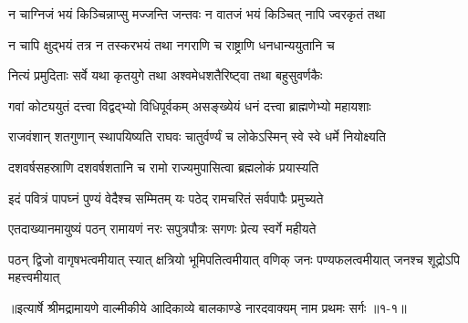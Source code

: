 \twolineshloka
{न चाग्निजं भयं किञ्चिन्नाप्सु मज्जन्ति जन्तवः}
{न वातजं भयं किञ्चित् नापि ज्वरकृतं तथा} %

\twolineshloka
{न चापि क्षुद्भयं तत्र न तस्करभयं तथा}
{नगराणि च राष्ट्राणि धनधान्ययुतानि च} %

\twolineshloka
{नित्यं प्रमुदिताः सर्वे यथा कृतयुगे तथा}
{अश्वमेधशतैरिष्ट्वा तथा बहुसुवर्णकैः} %

\twolineshloka
{गवां कोट्ययुतं दत्त्वा विद्वद्भ्यो विधिपूर्वकम्}
{असङ्ख्येयं धनं दत्त्वा ब्राह्मणेभ्यो महायशाः} %

\twolineshloka
{राजवंशान् शतगुणान् स्थापयिष्यति राघवः}
{चातुर्वर्ण्यं च लोकेऽस्मिन् स्वे स्वे धर्मे नियोक्ष्यति} %

\twolineshloka
{दशवर्षसहस्राणि दशवर्षशतानि च}
{रामो राज्यमुपासित्वा ब्रह्मलोकं प्रयास्यति} %

\twolineshloka
{इदं पवित्रं पापघ्नं पुण्यं वेदैश्च सम्मितम्}
{यः पठेद् रामचरितं सर्वपापैः प्रमुच्यते} %

\twolineshloka
{एतदाख्यानमायुष्यं पठन् रामायणं नरः}
{सपुत्रपौत्रः सगणः प्रेत्य स्वर्गे महीयते} %

\fourlineindentedshloka
{पठन् द्विजो वागृषभत्वमीयात्}
{स्यात् क्षत्रियो भूमिपतित्वमीयात्}
{वणिक् जनः पण्यफलत्वमीयात्}
{जनश्च शूद्रोऽपि महत्त्वमीयात्} %


॥इत्यार्षे श्रीमद्रामायणे वाल्मीकीये आदिकाव्ये बालकाण्डे नारदवाक्यम् नाम प्रथमः सर्गः ॥१-१॥
